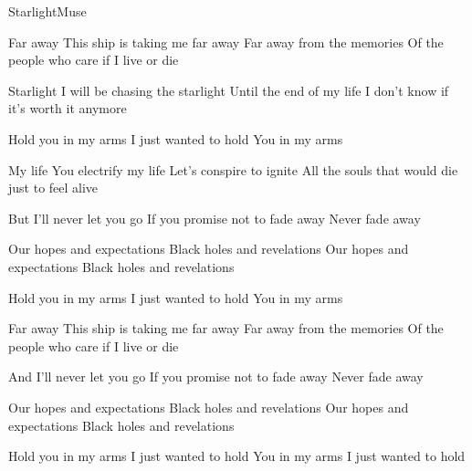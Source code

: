 \documentclass[a4paper,11pt,french]{article}
\begin{document}

\begin{Song}{Starlight}{Muse}

\begin{multicols}{2}
\begin{Verse}
Far away
This ship is taking me far away
Far away from the memories
Of the people who care if I live or die
\espaceInterStrophe

Starlight
I will be chasing the starlight
Until the end of my life
I don't know if it's worth it anymore
\end{Verse}
\espaceInterStrophe

\begin{Chorus}
Hold you in my arms
I just wanted to hold
You in my arms
\end{Chorus}
\espaceInterStrophe

\begin{Verse}
My life
You electrify my life
Let's conspire to ignite
All the souls that would die just to feel alive
\end{Verse}
\espaceInterStrophe

\begin{Bridge}
But I'll never let you go
If you promise not to fade away
Never fade away
\espaceInterStrophe

Our hopes and expectations
Black holes and revelations
Our hopes and expectations
Black holes and revelations
\end{Bridge}
\columnbreak

\begin{Chorus}
Hold you in my arms
I just wanted to hold
You in my arms
\end{Chorus}
\espaceInterStrophe

\begin{Verse}
Far away
This ship is taking me far away
Far away from the memories
Of the people who care if I live or die
\end{Verse}
\espaceInterStrophe

\begin{Bridge}
And I'll never let you go
If you promise not to fade away
Never fade away
\espaceInterStrophe

Our hopes and expectations
Black holes and revelations
Our hopes and expectations
Black holes and revelations
\end{Bridge}
\espaceInterStrophe

\begin{Chorus}
Hold you in my arms
I just wanted to hold
You in my arms
I just wanted to hold
\end{Chorus}


\end{multicols}
\end{Song}
\end{document}
